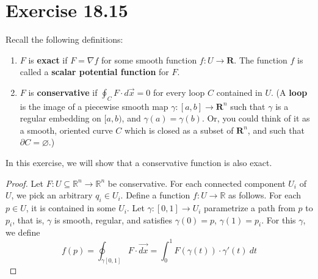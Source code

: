 \documentclass{article}
\newcommand{\R}{\mathbf{R}}
\theoremstyle{plain} %
\numberwithin{thm}{section} %
\theoremstyle{definition}
\begin{document}
    \section*{Exercise 18.15}
    Recall the following definitions:
    \begin{enumerate}[label=(\alph*)]
        \item $F$ is \textbf{exact} if $F=\nabla f$ for some smooth function $f:U\rightarrow \R$. The function $f$ is called a \textbf{scalar potential function} for $F$.
        \item $F$ is \textbf{conservative} if $\displaystyle \oint_CF \cdot d\vec{x}=0$ for every loop $C$ contained in $U$. (A \textbf{loop} is the image of a piecewise smooth map $\gamma:[a,b]\rightarrow \R^n$ such that $\gamma$ is a regular embedding on $[a,b)$, and $\gamma(a)=\gamma(b)$. Or, you could think of it as a smooth, oriented curve $C$ which is closed as a subset of $\R^n$, and such that $\partial C = \varnothing$.)
    \end{enumerate}
    In this exercise, we will show that a conservative function is also exact.
    \begin{proof}
        Let \(F: U \subseteq \mathbb{R}^n \to \mathbb{R}^n\) be conservative. For each connected component \(U_i\) of \(U\), we pick an arbitrary \(q_i \in U_i\). Define a function \(f: U \to \mathbb{R}\) as follows. For each \(p \in U\), it is contained in some \(U_i\). Let \(\gamma : [0,1] \to U_i\) parametrize a path from \(p\) to \(p_i\), that is, \(\gamma\) is smooth, regular, and satisfies \(\gamma (0) = p\), \(\gamma (1) = p_i\). For this \(\gamma\), we define
        \[
            f(p) = \oint _{\gamma [0,1]} F \cdot \vec{dx} = \int _0^1 F (\gamma (t))\cdot \gamma '(t)\ dt
        \]
    \end{proof}
\end{document}
